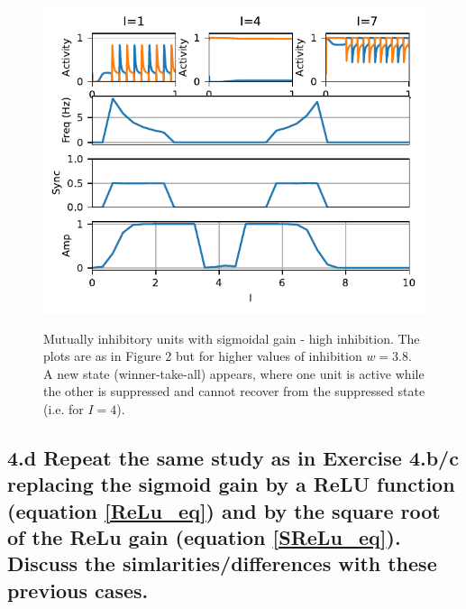 \documentclass{cmc}
\begin{document}

\begin{figure}
	\centering \includegraphics[width=1\linewidth]{figures/coupled_inhibitory_units_-_high_inhibition_and_sigmoid_gain}\\
    \caption{Mutually inhibitory units with sigmoidal gain - high inhibition. The plots are as in Figure 2 but for higher values of inhibition $w=3.8$. A new state (winner-take-all) appears, where one unit is active while the other is suppressed and cannot recover from the suppressed state (i.e. for $I=4$).
    \label{fig:plot_coupled_high_inhibition}}
\end{figure}




\subsection*{4.d Repeat the same study as in Exercise 4.b/c replacing the sigmoid gain by a ReLU
 function (equation \ref{ReLu_eq}) and by the square root of the ReLu gain (equation \ref{SReLu_eq}). Discuss the simlarities/differences with these previous cases.}


\end{document}
